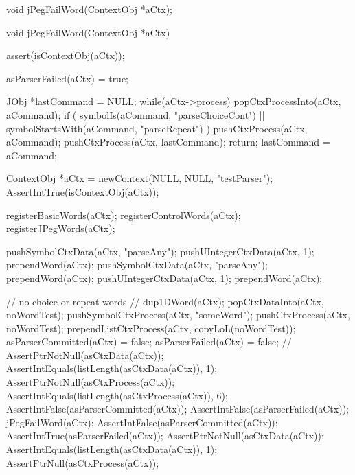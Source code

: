 \startTestSuite[jPegFailWord]

\startCHeader
void jPegFailWord(ContextObj *aCtx);
\stopCHeader

\startCCode
void jPegFailWord(ContextObj *aCtx) {
  assert(isContextObj(aCtx));

  asParserFailed(aCtx) = true;
  
  JObj *lastCommand = NULL;
  while(aCtx->process) {
    popCtxProcessInto(aCtx, aCommand);
    if (
      symbolIs(aCommand, "parseChoiceCont") ||
      symbolStartsWith(aCommand, "parseRepeat")
    ) {
      pushCtxProcess(aCtx, aCommand);
      pushCtxProcess(aCtx, lastCommand);
      return;
    }
    lastCommand = aCommand;
  }
}
\stopCCode


\startCTest
  ContextObj *aCtx = newContext(NULL, NULL, "testParser");
  AssertIntTrue(isContextObj(aCtx));
  
  registerBasicWords(aCtx);
  registerControlWords(aCtx);
  registerJPegWords(aCtx);
  
  pushSymbolCtxData(aCtx, "parseAny");
  pushUIntegerCtxData(aCtx, 1);
  prependWord(aCtx);
  pushSymbolCtxData(aCtx, "parseAny");
  prependWord(aCtx);
  pushUIntegerCtxData(aCtx, 1);
  prependWord(aCtx);  

  // no choice or repeat words
  //
  {
  dup1DWord(aCtx);
  popCtxDataInto(aCtx, noWordTest);
  pushSymbolCtxProcess(aCtx, "someWord");
  pushCtxProcess(aCtx, noWordTest);
  prependListCtxProcess(aCtx, copyLoL(noWordTest));
  asParserCommitted(aCtx) = false;
  asParserFailed(aCtx) = false;
  //
  AssertPtrNotNull(asCtxData(aCtx));
  AssertIntEquals(listLength(asCtxData(aCtx)), 1);
  AssertPtrNotNull(asCtxProcess(aCtx));
  AssertIntEquals(listLength(asCtxProcess(aCtx)), 6);
  AssertIntFalse(asParserCommitted(aCtx));
  AssertIntFalse(asParserFailed(aCtx));
  jPegFailWord(aCtx);
  AssertIntFalse(asParserCommitted(aCtx));
  AssertIntTrue(asParserFailed(aCtx));
  AssertPtrNotNull(asCtxData(aCtx));
  AssertIntEquals(listLength(asCtxData(aCtx)), 1);
  AssertPtrNull(asCtxProcess(aCtx));
  }
  
